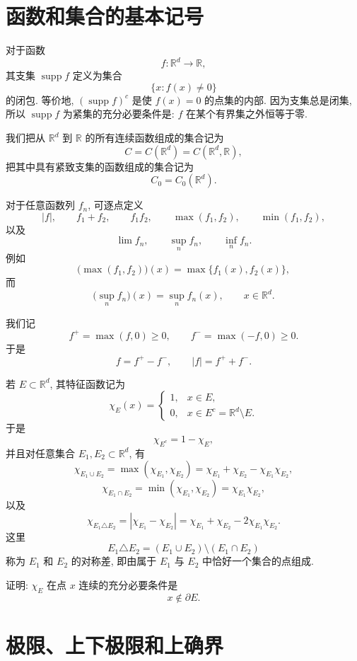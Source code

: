 \section{函数和集合的基本记号}
\label{app:function-set-notation}

对于函数
\[
f:\mathbb R^d\longrightarrow\mathbb R,
\]
其支集 \(\operatorname{supp}f\) 定义为集合
\[
\{x:f(x)\neq0\}
\]
的闭包. 等价地, \((\operatorname{supp}f)^c\) 是使 \(f(x)=0\) 的点集的内部. 因为支集总是闭集, 所以 \(\operatorname{supp}f\) 为紧集的充分必要条件是: \(f\) 在某个有界集之外恒等于零.

我们把从 \(\mathbb R^d\) 到 \(\mathbb R\) 的所有连续函数组成的集合记为
\[
C=C(\mathbb R^d)=C(\mathbb R^d,\mathbb R),
\]
把其中具有紧致支集的函数组成的集合记为
\[
C_0=C_0(\mathbb R^d).
\]

对于任意函数列 \(f_n\), 可逐点定义
\[
|f|,\qquad f_1+f_2,\qquad f_1f_2,\qquad
\max(f_1,f_2),\qquad \min(f_1,f_2),
\]
以及
\[
\lim f_n,\qquad \sup_n f_n,\qquad \inf_n f_n.
\]
例如
\[
\bigl(\max(f_1,f_2)\bigr)(x)=\max\{f_1(x),f_2(x)\},
\]
而
\[
\bigl(\sup_n f_n\bigr)(x)=\sup_n f_n(x),
\qquad x\in\mathbb R^d.
\]

我们记
\[
f^+=\max(f,0)\geq0,
\qquad
f^-=\max(-f,0)\geq0.
\]
于是
\[
f=f^+-f^-,
\qquad
|f|=f^++f^-.
\]

若 \(E\subset\mathbb R^d\), 其特征函数记为
\[
\chi_E(x)=
\begin{cases}
	1, & x\in E,\\
	0, & x\in E^c=\mathbb R^d\setminus E.
\end{cases}
\]
于是
\[
\chi_{E^c}=1-\chi_E,
\]
并且对任意集合 \(E_1,E_2\subset\mathbb R^d\), 有
\[
\chi_{E_1\cup E_2}
=
\max(\chi_{E_1},\chi_{E_2})
=
\chi_{E_1}+\chi_{E_2}-\chi_{E_1}\chi_{E_2},
\]
\[
\chi_{E_1\cap E_2}
=
\min(\chi_{E_1},\chi_{E_2})
=
\chi_{E_1}\chi_{E_2},
\]
以及
\[
\chi_{E_1\triangle E_2}
=
|\chi_{E_1}-\chi_{E_2}|
=
\chi_{E_1}+\chi_{E_2}-2\chi_{E_1}\chi_{E_2}.
\]
这里
\[
E_1\triangle E_2=(E_1\cup E_2)\setminus(E_1\cap E_2)
\]
称为 \(E_1\) 和 \(E_2\) 的对称差, 即由属于 \(E_1\) 与 \(E_2\) 中恰好一个集合的点组成.

\begin{exer}
	\label{exer:indicator-continuity-boundary}
	证明: \(\chi_E\) 在点 \(x\) 连续的充分必要条件是
	\[
	x\notin\partial E.
	\]
\end{exer}

\section{极限、上下极限和上确界}
\label{app:limsup-sup-notation}

